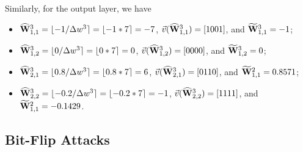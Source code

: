\begin{example}
    Similarly, for the output layer, we have 
     \begin{itemize}
        \item $\widehat{{\mathbf{W}}}^3_{1,1}=\lfloor -1/\Delta w^3 \rceil=\lfloor -1*7 \rceil =-7$, $\vec{v}(\widehat{{\mathbf{W}}}^{3}_{1,1})=[1001]$, and $\widetilde{{\mathbf{W}}}^3_{1,1}=-1$;
        \item $\widehat{{\mathbf{W}}}^3_{1,2}=\lfloor 0/\Delta w^3  \rceil=\lfloor 0*7  \rceil=0$, $\vec{v}(\widehat{{\mathbf{W}}}^{3}_{1,2})=[0000]$, and $\widetilde{{\mathbf{W}}}^3_{1,2}=0$;
        \item $\widehat{{\mathbf{W}}}^3_{2,1}=\lfloor 0.8/\Delta w^3  \rceil=\lfloor 0.8*7 \rceil =6$, $\vec{v}(\widehat{{\mathbf{W}}}^{3}_{2,1})=[0110]$, and $\widetilde{{\mathbf{W}}}^2_{1,1}=0.8571$;
        \item $\widehat{{\mathbf{W}}}^3_{2,2}=\lfloor -0.2/\Delta w^3  \rceil=\lfloor -0.2*7 \rceil =-1$, $\vec{v}(\widehat{{\mathbf{W}}}^{3}_{2,2})=[1111]$, and $\widetilde{{\mathbf{W}}}^2_{1,1}=-0.1429$.
    \end{itemize}
    
\end{example}


\subsection{Bit-Flip Attacks}

